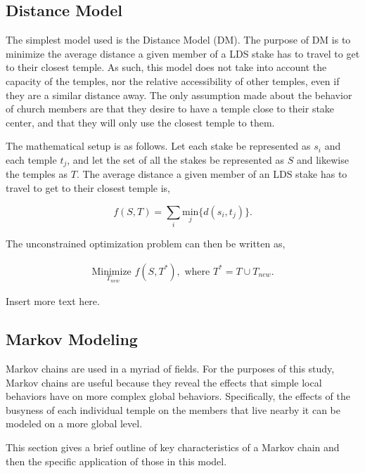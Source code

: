 \documentclass[twoside,twocolumn]{article}
\begin{document}
\subsection{Distance Model} 

The simplest model used is the Distance Model (DM). The purpose of DM is to minimize the average distance a given member of a LDS stake has to travel to get to their closest temple. As such, this model does not take into account the capacity of the temples, nor the relative accessibility of other temples, even if they are a similar distance away. The only assumption made about the behavior of church members are that they desire to have a temple close to their stake center, and that they will only use the closest temple to them.

The mathematical setup is as follows. Let each stake be represented as $s_i$ and each temple $t_j$, and let the set of all the stakes be represented as $S$ and likewise the temples as $T$. The average distance a given member of an LDS stake has to travel to get to their closest temple is, 

\begin{equation}
	f(S,T) = \sum_i \underset{j}{\text{min}}\{d(s_i,t_j)\}.
\end{equation}

The unconstrained optimization problem can then be written as,

\begin{equation}
\begin{aligned}
	\underset{T_{new}}{\text{Minimize }} f(S,T^*), \text{ where } T^* = T \cup T_{new}.
\end{aligned}
\end{equation}

Insert more text here.


\subsection{Markov Modeling}

Markov chains are used in a myriad of fields. For the purposes of this study, Markov chains are useful because they reveal the effects that simple local behaviors have on more complex global behaviors. Specifically, the effects of the busyness of each individual temple on the members that live nearby it can be modeled on a more global level.

This section gives a brief outline of key characteristics of a Markov chain and then the specific application of those in this model.
\end{document}
